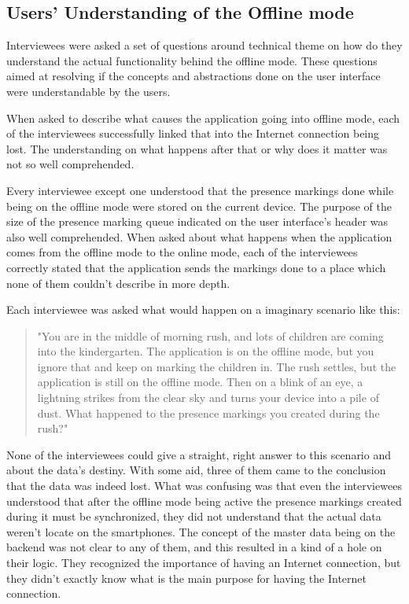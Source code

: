 



\subsection{Users' Understanding of the Offline mode}
\label{subsec:offline-understanding}

Interviewees were asked a set of questions around technical theme on how do they understand the actual functionality behind the offline mode. These questions aimed at resolving if the concepts and abstractions done on the user interface were understandable by the users. 

When asked to describe what causes the application going into offline mode, each of the interviewees successfully linked that into the Internet connection being lost. The understanding on what happens after that or why does it matter was not so well comprehended. 

Every interviewee except one understood that the presence markings done while being on the offline mode were stored on the current device. The purpose of the size of the presence marking queue indicated on the user interface's header was also well comprehended. When asked about what happens when the application comes from the offline mode to the online mode, each of the interviewees correctly stated that the application sends the markings done to a place which none of them couldn't describe in more depth.

Each interviewee was asked what would happen on a imaginary scenario like this: 
\begin{quote}
"You are in the middle of morning rush, and lots of children are coming into the kindergarten. The application is on the offline mode, but you ignore that and keep on marking the children in. The rush settles, but the application is still on the offline mode. Then on a blink of an eye, a lightning strikes from the clear sky and turns your device into a pile of dust. What happened to the presence markings you created during the rush?" 
\end{quote}

None of the interviewees could give a straight, right answer to this scenario and about the data's destiny. With some aid, three of them came to the conclusion that the data was indeed lost. What was confusing was that even the interviewees understood that after the offline mode being active the presence markings created during it must be synchronized, they did not understand that the actual data weren't locate on the smartphones. The concept of the master data being on the backend was not clear to any of them, and this resulted in a kind of a hole on their logic. They recognized the importance of having an Internet connection, but they didn't exactly know what is the main purpose for having the Internet connection.







